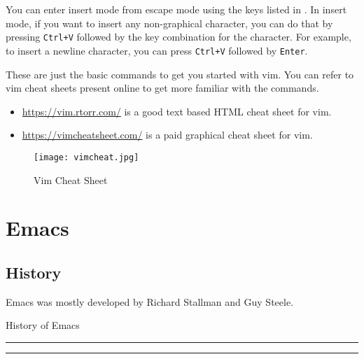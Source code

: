 You can enter insert mode from escape mode using the
keys listed in .
In insert mode, if you want to insert any non-graphical character,
you can do that by pressing \texttt{Ctrl+V} followed by the
key combination for the character. For example, to insert
a newline character, you can press \texttt{Ctrl+V} followed
by \texttt{Enter}.

These are just the basic commands to get you started with vim.
You can refer to vim cheat sheets present online to get
more familiar with the commands.

\begin{itemize}
  \item \url{https://vim.rtorr.com/} is a good text based HTML cheat sheet for vim.
  \item \url{https://vimcheatsheet.com/} is a paid graphical cheat sheet for vim.
\end{itemize}

\begin{figure*}[p]
  \texttt{[image: vimcheat.jpg]}
  \caption{Vim Cheat Sheet}
\end{figure*}

\vfill
\pagebreak
\section{Emacs}

\subsection{History}

Emacs was mostly developed by Richard Stallman and Guy Steele.

\begin{table}[h!]
\caption{History of Emacs}
\centering
\begin{minipage}[t]{.7\linewidth}
\color{gray}
\rule{\linewidth}{1pt}
\bigskip
\rule{\linewidth}{1pt}
\end{minipage}
\end{table}


